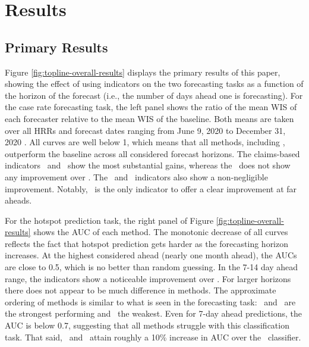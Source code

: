 \documentclass[9pt,twocolumn,twoside,lineno]{pnas-new}
\begin{document}
\section{Results}

\subsection{Primary Results}

Figure \ref{fig:topline-overall-results} displays the primary results
of this paper, showing the effect of using indicators on the two
forecasting tasks as a function of the horizon of the forecast (i.e.,
the number of days ahead one is forecasting). For the case rate forecasting
task, the left panel shows the ratio of the mean
WIS 
of each forecaster relative to the mean WIS of the
baseline.   Both means are taken over all HRRs and forecast
dates ranging from June 9, 2020 to December 31, 2020 .
All curves are well below 1, which means that all methods, including \ar, outperform the baseline across all
considered forecast horizons. The claims-based
indicators \dv~and \chngcov~show the most substantial gains, whereas
the \chngcli~does not show any improvement over \ar.  The \fb~and
\gs~indicators also show a non-negligible improvement.  Notably,
\fb~is the only indicator to offer a clear improvement at far aheads.

For the hotspot prediction task, the right panel of Figure
\ref{fig:topline-overall-results} shows the AUC of each method.
The monotonic decrease of all curves reflects the fact that hotspot
prediction gets harder as the forecasting horizon increases. At the
highest considered ahead (nearly one month ahead), the AUCs are close
  to 0.5, which is no better than random guessing.
In the 7-14 day ahead range, the indicators show a noticeable
  improvement over \ar.  For larger horizons there does not
  appear to be much difference in methods.
The approximate ordering of methods is similar to what is seen
  in the forecasting task: \chngcov~and \dv~are the strongest
  performing and \ar~the weakest.
Even for 7-day ahead predictions, the AUC is below 0.7,
  suggesting that all methods struggle with this classification
  task. 
  That said, \dv~and \chngcov~attain roughly a 10\% increase in AUC
  over the \ar~classifier.
  
\end{document}
